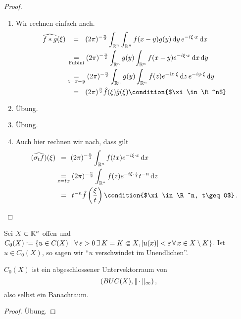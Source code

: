 \begin{proof}
  \begin{enumerate}[\rm(a)]
  \item Wir rechnen einfach nach.
    \begin{align*}
      \widehat{f\ast g} (\xi)
      & \ \ \,  = \, \, \, \, (2\pi)^{-\frac n2}\int_{\R^n}\int_{\R^n}f(x-y)g(y)\d y \,  e^{-i\xi\cdot x}\d x\\
      &\, \underset{\scriptsize\text{Fubini}}=(2\pi)^{-\frac n2}\int_{\R^n}g(y)\int_{\R^n}f(x-y)e^{-i\xi\cdot x}\d x\d y\\
      &\underset{z=x-y}=(2\pi)^{-\frac n2}\int_{\R^n}g(y)\int_{\R^n}f(z)e^{-iz\cdot\xi}\d z \, e^{-iy\cdot\xi}\d y \\
      &\ \ \,  = \, \, \, \,  (2\pi)^{\frac n2}\hat f(\xi)\hat g(\xi)
      \condition{$\xi\in\R^n$}
    \end{align*}
    \item Übung.
    \item Übung.
    \item Auch hier rechnen wir nach, dass gilt
      \begin{align*}
        (\widehat{\sigma_tf})(\xi) &\, \  = \text{ } (2\pi)^{-\frac n2}\int_{\R^n}f(tx)e^{-i\xi\cdot x}\d x\\
     &   \underset{z=tx}=(2\pi)^{-\frac n2}\int_{\R^n}f(z)e^{-i\xi\cdot\frac zt}t^{-n}\d z \\
       &\ \,  =\, \, \, t^{-n}\hat f\left(\frac \xi t\right)
        \condition{$\xi\in\R^n, t\geq0$} \, . \qedhere
      \end{align*}
  \end{enumerate}
\end{proof}

\begin{defi}
  Sei $X\subset\mathbb{R}^n$ offen und $C_0(X):=\{u\in C(X)\;\vert\,\,  \forall\,  \varepsilon>0\, \exists \,  K=\bar K\Subset X, \lvert u(x)\rvert<\varepsilon\, \forall\, x\in X\setminus K\}$. Ist $u\in C_0(X)$, so sagen wir "`$u$ verschwindet im Unendlichen"'.
\end{defi}

\begin{bem}
  \label{bem:8.2}
  $C_0(X)$ ist ein abgeschlossener Untervektorraum von 
  \[ (BUC(X), \lVert \, \cdot\, \rVert_\infty)\, ,\] also selbst ein Banachraum.
\end{bem}

\begin{proof}
  Übung.
\end{proof}

